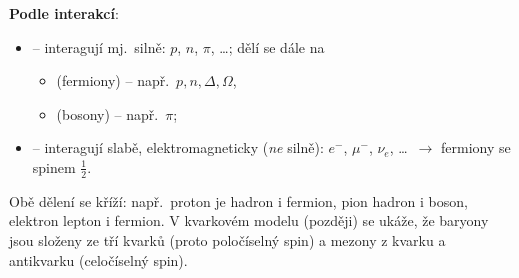 \textbf{Podle interakcí}:
\begin{itemize}
  \item {} – interagují mj.\ silně: \(p\), \(n\), \(\pi\), \dots;
  dělí se dále na
  \begin{itemize}
    \item {} (fermiony) – např.\ \(p, n, \Delta, \Omega\),
    \item {} (bosony) – např.\ \(\pi\);
  \end{itemize}
  \item {} – interagují slabě, elektromagneticky (\emph{ne} silně):
  \(e^-\), \(\mu^-\), \(\nu_e\), \dots\ \(\to\) fermiony se spinem \(\tfrac12\).
\end{itemize}
Obě dělení se kříží: např.\ proton je hadron i fermion, pion hadron
i boson, elektron lepton i fermion. V kvarkovém modelu (později) se ukáže,
že baryony jsou složeny ze tří kvarků (proto poločíselný spin) a mezony
z kvarku a antikvarku (celočíselný spin).
